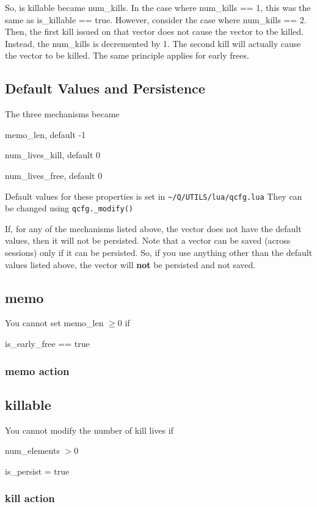 So, is killable became num\_kills. In the case where num\_kills == 1, this was
the same as is\_killable == true. However, consider the case where num\_kills ==
2. Then, the first kill issued on that vector does not cause the vector to tbe
killed. Instead, the num\_kills is decremented by 1. The second kill will
actually cause the vector to be killed. The same principle applies for early
frees. 


\subsection{Default Values and Persistence}
The three mechanisms became
\be
\item memo\_len, default -1
\item num\_lives\_kill, default 0
\item num\_lives\_free, default 0
\ee

Default values for these properties is set in \verb+~/Q/UTILS/lua/qcfg.lua+
They can be changed using \verb+qcfg._modify()+ 

If, for any of the mechanisms listed above, the vector does not have the default
values, then it will not be persisted. 
Note that a vector can be saved (across sessions) only if it can be persisted.
So, if you use anything other than the default values listed above, the vector
will {\bf not} be persisted and not saved.

\subsection{memo}
You cannot set memo\_len \(\geq 0\) if
\be
\item is\_early\_free == true 
\ee
\subsubsection{memo action}

\subsection{killable}

You cannot modify the number of kill lives if 
\be
\item num\_elements \(> 0\)
\item is\_persist = true 
\ee

\subsubsection{kill action}

